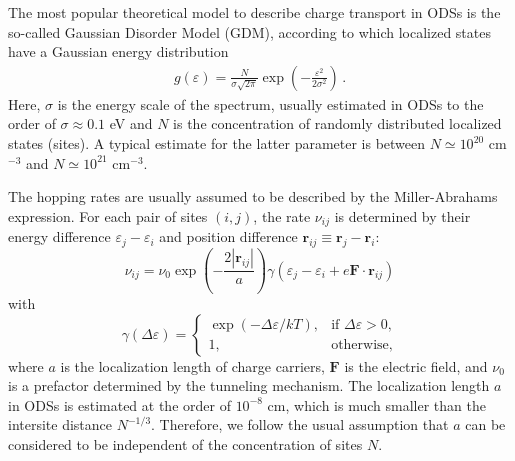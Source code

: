 \documentclass[aps,reprint,amsmath,amssymb,superscriptaddress,showpacs,prb]{revtex4-1}
\newcommand{\ve}{\varepsilon}
\renewcommand{\alpha}{ a }
\begin{document}
The most popular theoretical model to describe charge transport in ODSs is the so-called Gaussian Disorder Model (GDM), according to which localized states have a Gaussian energy distribution\cite{Silinsh1970,Bassler1981,Bassler1993,Oelerich2012}
\begin{align}
	\label{DOS_Gauss}
	g(\varepsilon) = \frac{N}{\sigma\sqrt{2\pi}}
	\exp\left(-\frac{\varepsilon
	^{2}}{2\sigma^{2}}\right) \, .
\end{align}
Here, $\sigma$ is the energy scale of the spectrum, usually
estimated\cite{Bassler1993} in ODSs to the order of $\sigma \approx 0.1$ eV
 and $N$ is the concentration of randomly distributed
localized states (sites). A typical estimate\cite{Baranovski2006,Baranovskii2014} for the latter parameter is
between $N \simeq 10^{20}$ cm$^{-3}$ and $N \simeq 10^{21}$ cm$^{-3}$.

The hopping rates are usually assumed \cite{Bassler1993} to be described by the Miller-Abrahams expression\cite{Miller1960}. For each pair of sites $(i,j)$, the rate $\nu_{ij}$ is determined by their energy difference $\ve_j-\ve_i$ and position difference $\mathbf{r}_{ij} \equiv \mathbf{r}_j-\mathbf{r}_i$:
\begin{equation}
	\label{eq:nu-ij}
	\nu_{ij} = \nu_0 \exp\left( -\frac{2|\mathbf{r}_{ij}|}{\alpha} \right) \gamma(\ve_j-\ve_i+e\mathbf{F}\cdot\mathbf{r}_{ij})
\end{equation}
with
\begin{equation}
	\label{eq:gamma}
	\gamma(\Delta\ve) =
	\begin{cases}
		\exp(-\Delta\ve / kT) , & \text{if $\Delta\ve>0$,} \\
		1,                      & \text{otherwise}  ,
	\end{cases}
\end{equation}
where $\alpha$ is the localization length of charge carriers, $\mathbf{F}$ is the electric field, and $\nu_0$ is a prefactor determined by the tunneling mechanism. The localization length $\alpha$ in ODSs is estimated \cite{Gill1972,Rubel2004} at the order of $10^{-8}$ cm, which is much smaller than the intersite distance $N^{-1/3}$. Therefore, we follow the usual assumption \cite{Silinsh1970,Bassler1981,Bassler1993,Borsenberger1993,Auweraer1994,Pope1999,Hadziioannou2000,Brabec2003,Bruetting2005,Baranovski2006,Schwoerer2007,Sun2008,Tessler2009,Meller2010,Geoghegan_2013,Baranovskii2014,Kuik2014,Anna_Heinz_2015,Nenashev_Topical_2015,Laquai2015} that $\alpha$ can be considered to be independent of the concentration of sites $N$.
\end{document}
